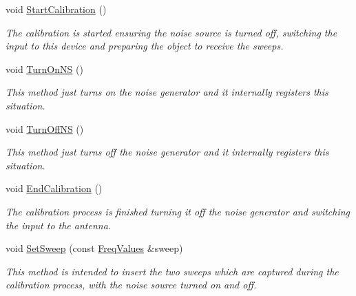 \begin{DoxyCompactItemize}
\mbox{\label{classFrontEndCalibrator_a548817f0476ac8a459a991a0518e9be5}} 
void \hyperlink{classFrontEndCalibrator_a548817f0476ac8a459a991a0518e9be5}{Start\+Calibration} ()
\begin{DoxyCompactList}\small\item\em The calibration is started ensuring the noise source is turned off, switching the input to this device and preparing the object to receive the sweeps. \end{DoxyCompactList}\item 
\mbox{\label{classFrontEndCalibrator_a816fdd2af713e8e980a96c9242ff0180}} 
void \hyperlink{classFrontEndCalibrator_a816fdd2af713e8e980a96c9242ff0180}{Turn\+On\+NS} ()
\begin{DoxyCompactList}\small\item\em This method just turns on the noise generator and it internally registers this situation. \end{DoxyCompactList}\item 
\mbox{\label{classFrontEndCalibrator_ad29e76f2ff18f7d794fa219fab97ab53}} 
void \hyperlink{classFrontEndCalibrator_ad29e76f2ff18f7d794fa219fab97ab53}{Turn\+Off\+NS} ()
\begin{DoxyCompactList}\small\item\em This method just turns off the noise generator and it internally registers this situation. \end{DoxyCompactList}\item 
\mbox{\label{classFrontEndCalibrator_a4ba6971b00b7736b80e04a5f9ca784dc}} 
void \hyperlink{classFrontEndCalibrator_a4ba6971b00b7736b80e04a5f9ca784dc}{End\+Calibration} ()
\begin{DoxyCompactList}\small\item\em The calibration process is finished turning it off the noise generator and switching the input to the antenna. \end{DoxyCompactList}\item 
\mbox{\label{classFrontEndCalibrator_a54329452d80cfb0fbcff947803091bb7}} 
void \hyperlink{classFrontEndCalibrator_a54329452d80cfb0fbcff947803091bb7}{Set\+Sweep} (const \hyperlink{structFreqValues}{Freq\+Values} \&sweep)
\begin{DoxyCompactList}\small\item\em This method is intended to insert the two sweeps which are captured during the calibration process, with the noise source turned on and off. \end{DoxyCompactList}\item 

\end{DoxyCompactItemize}
